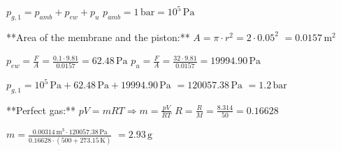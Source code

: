 \( p_{g,1} = p_{amb} + p_{ew} + p_{u} \)  
\( p_{amb} = 1 \, \text{bar} = 10^5 \, \text{Pa} \)  

**Area of the membrane and the piston:**  
\( A = \pi \cdot r^2 = 2 \cdot 0.05^2 \)  
\( = 0.0157 \, \text{m}^2 \)  

\( p_{ew} = \frac{F}{A} = \frac{0.1 \cdot 9.81}{0.0157} = 62.48 \, \text{Pa} \)  
\( p_{u} = \frac{F}{A} = \frac{32 \cdot 9.81}{0.0157} = 19994.90 \, \text{Pa} \)  

\( p_{g,1} = 10^5 \, \text{Pa} + 62.48 \, \text{Pa} + 19994.90 \, \text{Pa} \)  
\( = 120057.38 \, \text{Pa} \)  
\( = 1.2 \, \text{bar} \)  

**Perfect gas:**  
\( pV = mRT \Rightarrow m = \frac{pV}{RT} \)  
\( R = \frac{R}{M} = \frac{8.314}{50} = 0.16628 \)  

\( m = \frac{0.00314 \, \text{m}^3 \cdot 120057.38 \, \text{Pa}}{0.16628 \cdot (500 + 273.15 \, \text{K})} \)  
\( = 2.93 \, \text{g} \)
